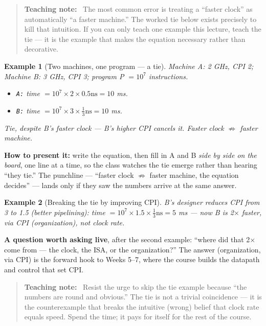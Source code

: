 \documentclass[11pt]{article}
\newtheorem{example}{Example}[section]
\newenvironment{teachingaside}{\begin{quote}\small\color{primary-gold}\textbf{Teaching note:}\ }{\end{quote}}
\begin{document}
\begin{teachingaside}
The most common error is treating a ``faster clock'' as automatically ``a faster machine.'' The worked tie below exists precisely to kill that intuition. If you can only teach one example this lecture, teach the tie --- it is the example that makes the equation necessary rather than decorative.
\end{teachingaside}

\begin{example}[Two machines, one program --- a tie]
Machine A: 2 GHz, CPI 2; Machine B: 3 GHz, CPI 3; program P $= 10^7$ instructions.
\begin{itemize}
  \item \texttt{A:} time $= 10^7 \times 2 \times 0.5\text{ns} = 10$ ms.
  \item \texttt{B:} time $= 10^7 \times 3 \times \tfrac{1}{3}\text{ns} = 10$ ms.
\end{itemize}
Tie, despite B's faster clock --- B's higher CPI cancels it. Faster clock $\not\Rightarrow$ faster machine.
\end{example}

\textbf{How to present it:} write the equation, then fill in A and B \emph{side by side on the board}, one line at a time, so the class watches the tie emerge rather than hearing ``they tie.'' The punchline --- ``faster clock $\not\Rightarrow$ faster machine, the equation decides'' --- lands only if they saw the numbers arrive at the same answer.

\begin{example}[Breaking the tie by improving CPI]
B's designer reduces CPI from 3 to 1.5 (better pipelining): time $= 10^7 \times 1.5 \times \tfrac{1}{3}\text{ns} = 5$ ms --- now B is 2$\times$ faster, via CPI (organization), not clock rate.
\end{example}

\textbf{A question worth asking live}, after the second example: ``where did that 2$\times$ come from --- the clock, the ISA, or the organization?'' The answer (organization, via CPI) is the forward hook to Weeks 5--7, where the course builds the datapath and control that set CPI.

\begin{teachingaside}
Resist the urge to skip the tie example because ``the numbers are round and obvious.'' The tie is not a trivial coincidence --- it is the counterexample that breaks the intuitive (wrong) belief that clock rate equals speed. Spend the time; it pays for itself for the rest of the course.
\end{teachingaside}
\end{document}
